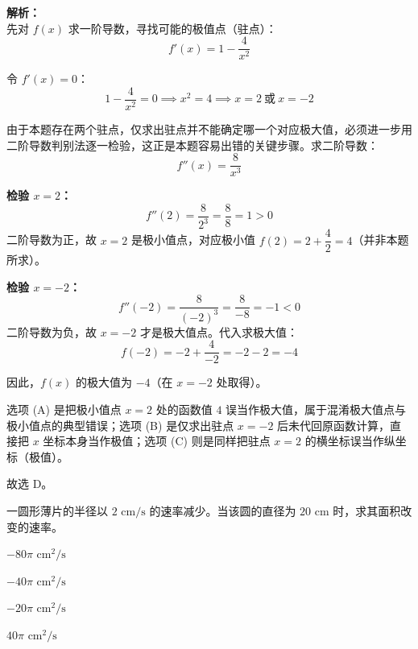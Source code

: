 \documentclass[12pt,a4paper]{exam-zh}
\begin{document}
\begin{solution}
    \textbf{解析：} \\
    先对 $f(x)$ 求一阶导数，寻找可能的极值点（驻点）：
    \[ \displaystyle f'(x) = 1 - \frac{4}{x^2} \]

    令 $f'(x) = 0$：
    \[ \displaystyle 1 - \frac{4}{x^2} = 0 \implies x^2 = 4 \implies x = 2 \ \text{或} \ x = -2 \]

    由于本题存在两个驻点，仅求出驻点并不能确定哪一个对应极大值，必须进一步用二阶导数判别法逐一检验，这正是本题容易出错的关键步骤。求二阶导数：
    \[ \displaystyle f''(x) = \frac{8}{x^3} \]

    \textbf{检验 $x = 2$：}
    \[ \displaystyle f''(2) = \frac{8}{2^3} = \frac{8}{8} = 1 > 0 \]
    二阶导数为正，故 $x=2$ 是极小值点，对应极小值 $f(2) = 2 + \dfrac{4}{2} = 4$（并非本题所求）。

    \textbf{检验 $x = -2$：}
    \[ \displaystyle f''(-2) = \frac{8}{(-2)^3} = \frac{8}{-8} = -1 < 0 \]
    二阶导数为负，故 $x=-2$ 才是极大值点。代入求极大值：
    \[ \displaystyle f(-2) = -2 + \frac{4}{-2} = -2 - 2 = -4 \]

    因此，$f(x)$ 的极大值为 $-4$（在 $x=-2$ 处取得）。

    选项 (A) 是把极小值点 $x=2$ 处的函数值 $4$ 误当作极大值，属于混淆极大值点与极小值点的典型错误；选项 (B) 是仅求出驻点 $x=-2$ 后未代回原函数计算，直接把 $x$ 坐标本身当作极值；选项 (C) 则是同样把驻点 $x=2$ 的横坐标误当作纵坐标（极值）。

    故选 D。
\end{solution}

\begin{question}
    一圆形薄片的半径以 $2\text{ cm/s}$ 的速率减少。当该圆的直径为 $20\text{ cm}$ 时，求其面积改变的速率。\paren[B]
    \begin{choices}
        \item $-80\pi \text{ cm}^2/\text{s}$
        \item $-40\pi \text{ cm}^2/\text{s}$
        \item $-20\pi \text{ cm}^2/\text{s}$
        \item $40\pi \text{ cm}^2/\text{s}$
    \end{choices}
\end{question}
\end{document}
